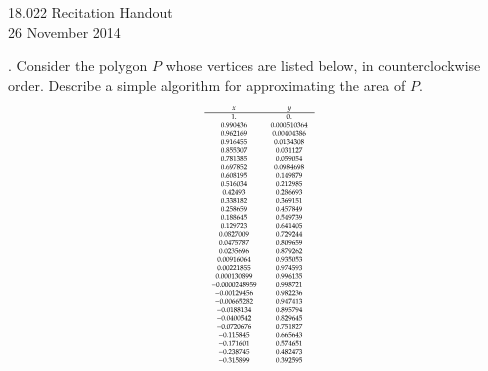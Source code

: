 \documentclass[11pt]{article}
\theoremstyle{definition}
\newcounter{prob}
\newcounter{subprob}
\newcommand\itm{\theprob.  \stepcounter{prob}\setcounter{subprob}{1}}
\begin{document}
\thispagestyle{empty}

\begin{center}
  18.022 Recitation Handout \iftoggle{solutions}{(with solutions)}{} \\
  26 November 2014 \\
\end{center}


\itm Consider the polygon $P$ whose vertices are listed below, in counterclockwise order. Describe a simple algorithm for approximating the area of $P$. 
$$ \tiny
\begin{array}{cc}
  x & y \\ \hline 
 1. & 0. \\
 0.990436 & 0.000510364 \\
 0.962169 & 0.00404386 \\
 0.916455 & 0.0134308 \\
 0.855307 & 0.031127 \\
 0.781385 & 0.059054 \\
 0.697852 & 0.0984698 \\
 0.608195 & 0.149879 \\
 0.516034 & 0.212985 \\
 0.42493 & 0.286693 \\
 0.338182 & 0.369151 \\
 0.258659 & 0.457849 \\
 0.188645 & 0.549739 \\
 0.129723 & 0.641405 \\
 0.0827009 & 0.729244 \\
 0.0475787 & 0.809659 \\
 0.0235696 & 0.879262 \\
 0.00916064 & 0.935053 \\
 0.00221855 & 0.974593 \\
 0.000130899 & 0.996135 \\
 -0.0000248959 & 0.998721 \\
 -0.00129456 & 0.982236 \\
 -0.00665282 & 0.947413 \\
 -0.0188134 & 0.895794 \\
 -0.0400542 & 0.829645 \\
 -0.0720676 & 0.751827 \\
 -0.115845 & 0.665643 \\
 -0.171601 & 0.574651 \\
 -0.238745 & 0.482473 \\
 -0.315899 & 0.392595 \\

\end{array}$$
\end{document}
